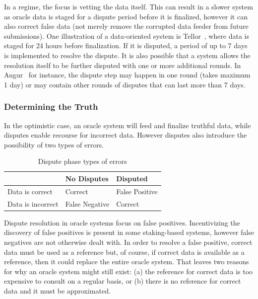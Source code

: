 In a  regime, the focus is vetting the data itself. This can result in a slower system as oracle data is staged for a dispute period before it is finalized, however it can also correct false data (not merely remove the corrupted data feeder from future submissions). One illustration of a data-oriented system is Tellor~\cite{tellorWhitepaper,tellordispute}, where data is staged for 24 hours before finalization. If it is disputed, a period of up to 7 days is implemented to resolve the dispute. It is also possible that a system allows the resolution itself to be further disputed with one or more additional rounds. In Augur~\cite{peterson2015augur} for instance, the dispute step may happen in one round (takes maximum 1 day) or may contain other rounds of disputes that can last more than 7 days. 



\subsubsection{Determining the Truth}

In the optimistic case, an oracle system will feed and finalize truthful data, while disputes enable recourse for incorrect data. However disputes also introduce the possibility of two types of errors.

\begin{table}[h]
	\centering
\begin{tabular}{l|l|l|}
& No Disputes & Disputed \\ \hline
Data is correct & Correct & False Positive \\
Data is incorrect & False Negative & Correct \\
\end{tabular}
\caption[Dispute phase types of errors]{Dispute phase types of errors}
\end{table}

Dispute resolution in oracle systems focus on false positives. Incentivizing the discovery of false positives is present in some staking-based systems, however false negatives are not otherwise dealt with. In order to resolve a false positive, correct data must be used as a reference but, of course, if correct data is available as a reference, then it could replace the entire oracle system. That leaves two reasons for why an oracle system might still exist: (a) the reference for correct data is too expensive to consult on a regular basis, or (b) there is no reference for correct data and it must be approximated. 

